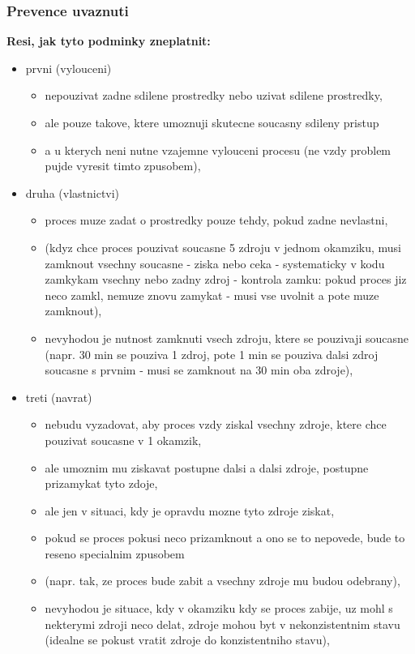 \documentclass[a4paper, 11pt]{article}
\begin{document}
\subsubsection{Prevence uvaznuti}
\textbf{Resi, jak tyto podminky zneplatnit:}
\begin{itemize}
    \item prvni (vylouceni)
    \begin{itemize}
        \item nepouzivat zadne sdilene prostredky nebo uzivat sdilene prostredky,
        \item ale pouze takove, ktere umoznuji skutecne soucasny sdileny pristup
        \item a u kterych neni nutne vzajemne vylouceni procesu (ne vzdy problem pujde vyresit timto zpusobem),
    \end{itemize}
    \item druha (vlastnictvi)
    \begin{itemize}
        \item proces muze zadat o prostredky pouze tehdy, pokud zadne nevlastni,
        \item (kdyz chce proces pouzivat soucasne 5 zdroju v jednom okamziku, musi zamknout vsechny soucasne - ziska nebo ceka - systematicky v kodu zamkykam vsechny nebo zadny zdroj - kontrola zamku: pokud proces jiz neco zamkl, nemuze znovu zamykat - musi vse uvolnit a pote muze zamknout),
        \item nevyhodou je nutnost zamknuti vsech zdroju, ktere se pouzivaji soucasne (napr. 30 min se pouziva 1 zdroj, pote 1 min se pouziva dalsi zdroj soucasne s prvnim - musi se zamknout na 30 min oba zdroje),
    \end{itemize}
    \item treti (navrat)
    \begin{itemize}
        \item nebudu vyzadovat, aby proces vzdy ziskal vsechny zdroje, ktere chce pouzivat soucasne v 1 okamzik,
        \item ale umoznim mu ziskavat postupne dalsi a dalsi zdroje, postupne prizamykat tyto zdoje,
        \item ale jen v situaci, kdy je opravdu mozne tyto zdroje ziskat,
        \item pokud se proces pokusi neco prizamknout a ono se to nepovede, bude to reseno specialnim zpusobem
        \item (napr. tak, ze proces bude zabit a vsechny zdroje mu budou odebrany),
        \item nevyhodou je situace, kdy v okamziku kdy se proces zabije, uz mohl s nekterymi zdroji neco delat, zdroje mohou byt v nekonzistentnim stavu (idealne se pokust vratit zdroje do konzistentniho stavu),

\end{itemize}
\end{itemize}
\end{document}
